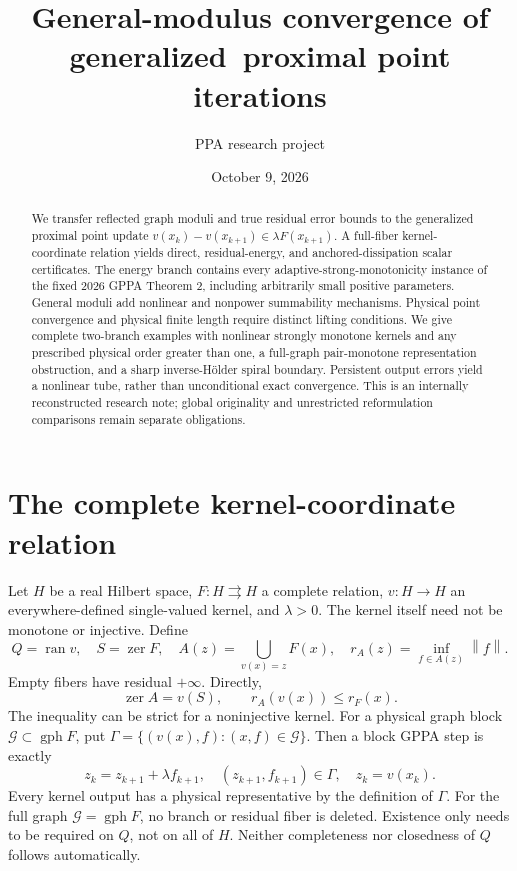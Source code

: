 \documentclass[11pt]{article}
\title{General-modulus convergence of generalized\ proximal point iterations}
\author{PPA research project}
\date{October 9, 2026}
\newcommand{\norm}[1]{\left\lVert#1\right\rVert}
\newcommand{\zer}{\operatorname{zer}}
\newcommand{\ran}{\operatorname{ran}}
\newcommand{\gph}{\operatorname{gph}}
\theoremstyle{remark}
\begin{document}
\maketitle
\begin{abstract}
We transfer reflected graph moduli and true residual error bounds to the
generalized proximal point update
$v(x_k)-v(x_{k+1})\in\lambda F(x_{k+1})$.
A full-fiber kernel-coordinate relation yields direct, residual-energy,
and anchored-dissipation scalar certificates. The energy branch contains
every adaptive-strong-monotonicity instance of the fixed 2026 GPPA
Theorem 2, including arbitrarily small positive parameters. General
moduli add nonlinear and nonpower summability mechanisms. Physical point
convergence and physical finite length require distinct lifting conditions.
We give complete two-branch examples with nonlinear strongly monotone
kernels and any prescribed physical order greater than one, a full-graph
pair-monotone representation obstruction, and a sharp inverse-H\"older
spiral boundary. Persistent output errors yield a nonlinear tube, rather
than unconditional exact convergence. This is an internally reconstructed
research note; global originality and unrestricted reformulation
comparisons remain separate obligations.
\end{abstract}

\section{The complete kernel-coordinate relation}
Let $H$ be a real Hilbert space, $F:H\rightrightarrows H$ a complete
relation, $v:H\to H$ an everywhere-defined single-valued kernel, and
$\lambda>0$. The kernel itself need not be monotone or injective. Define
\begin{equation}\label{eq:union}
 Q=\ran v,\quad S=\zer F,\quad
 A(z)=\bigcup_{v(x)=z}F(x),\quad
 r_A(z)=\inf_{f\in A(z)}\norm f.
\end{equation}
Empty fibers have residual $+\infty$. Directly,
\begin{equation}\label{eq:zeros}
 \zer A=v(S),\qquad r_A(v(x))\le r_F(x).
\end{equation}
The inequality can be strict for a noninjective kernel. For a physical
graph block $\mathcal G\subset\gph F$, put
$\Gamma=\{(v(x),f):(x,f)\in\mathcal G\}$.
Then a block GPPA step is exactly
\begin{equation}\label{eq:step}
 z_k=z_{k+1}+\lambda f_{k+1},\quad
 (z_{k+1},f_{k+1})\in\Gamma,\quad z_k=v(x_k).
\end{equation}
Every kernel output has a physical representative by the definition of
$\Gamma$. For the full graph $\mathcal G=\gph F$, no branch or residual
fiber is deleted. Existence only needs to be required on $Q$, not on all
of $H$. Neither completeness nor closedness of $Q$ follows automatically.
\end{document}
